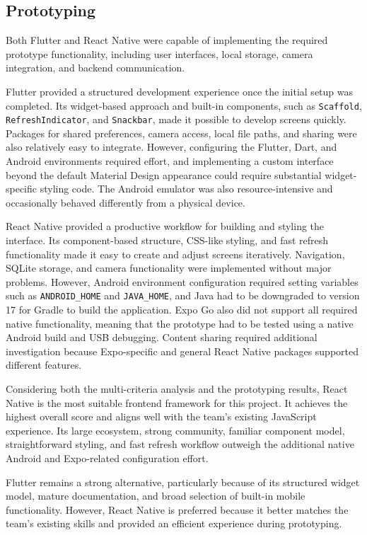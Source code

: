 \subsection{Prototyping}
Both Flutter and React Native were capable of implementing the required prototype functionality, including user interfaces, local storage, camera integration, and backend communication.

Flutter provided a structured development experience once the initial setup was completed.
Its widget-based approach and built-in components, such as \texttt{Scaffold}, \texttt{RefreshIndicator}, and \texttt{Snackbar}, made it possible to develop screens quickly.
Packages for shared preferences, camera access, local file paths, and sharing were also relatively easy to integrate.
However, configuring the Flutter, Dart, and Android environments required effort, and implementing a custom interface beyond the default Material Design appearance could require substantial widget-specific styling code.
The Android emulator was also resource-intensive and occasionally behaved differently from a physical device.

React Native provided a productive workflow for building and styling the interface.
Its component-based structure, CSS-like styling, and fast refresh functionality made it easy to create and adjust screens iteratively.
Navigation, SQLite storage, and camera functionality were implemented without major problems.
However, Android environment configuration required setting variables such as \texttt{ANDROID\_HOME} and \texttt{JAVA\_HOME}, and Java had to be downgraded to version 17 for Gradle to build the application.
Expo Go also did not support all required native functionality, meaning that the prototype had to be tested using a native Android build and USB debugging.
Content sharing required additional investigation because Expo-specific and general React Native packages supported different features.

Considering both the multi-criteria analysis and the prototyping results, React Native is the most suitable frontend framework for this project.
It achieves the highest overall score and aligns well with the team's existing JavaScript experience.
Its large ecosystem, strong community, familiar component model, straightforward styling, and fast refresh workflow outweigh the additional native Android and Expo-related configuration effort.

Flutter remains a strong alternative, particularly because of its structured widget model, mature documentation, and broad selection of built-in mobile functionality.
However, React Native is preferred because it better matches the team's existing skills and provided an efficient experience during prototyping.
